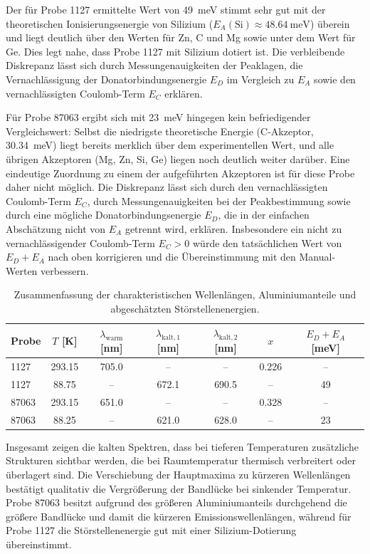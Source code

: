 \documentclass{article}
\begin{document}
Der für Probe 1127 ermittelte Wert von \SI{49}{\milli\electronvolt} stimmt sehr gut mit der theoretischen Ionisierungsenergie von Silizium
($E_A(\mathrm{Si})\approx\SI{48.64}{\milli\electronvolt}$) überein und liegt deutlich über den Werten
für Zn, C und Mg sowie unter dem Wert für Ge. Dies legt nahe, dass Probe 1127 mit Silizium dotiert ist.
Die verbleibende Diskrepanz lässt sich durch Messungenauigkeiten der Peaklagen, die Vernachlässigung
der Donatorbindungsenergie $E_D$ im Vergleich zu $E_A$ sowie den vernachlässigten Coulomb-Term $E_C$
erklären.

Für Probe 87063 ergibt sich mit \SI{23}{\milli\electronvolt} hingegen kein befriedigender Vergleichswert: Selbst die niedrigste theoretische Energie
(C-Akzeptor, \SI{30.34}{\milli\electronvolt}) liegt bereits merklich über dem experimentellen Wert, und
alle übrigen Akzeptoren (Mg, Zn, Si, Ge) liegen noch deutlich weiter darüber. Eine eindeutige
Zuordnung zu einem der aufgeführten Akzeptoren ist für diese Probe daher nicht möglich. Die
Diskrepanz lässt sich durch den vernachlässigten Coulomb-Term $E_C$, durch Messungenauigkeiten bei der
Peakbestimmung sowie durch eine mögliche Donatorbindungsenergie $E_D$, die in der einfachen Abschätzung
nicht von $E_A$ getrennt wird, erklären. Insbesondere ein nicht zu vernachlässigender Coulomb-Term
$E_C>0$ würde den tatsächlichen Wert von $E_D+E_A$ nach oben korrigieren und die Übereinstimmung mit
den Manual-Werten verbessern.

\begin{table}[H]
\centering
\caption{Zusammenfassung der charakteristischen Wellenlängen, Aluminiumanteile und abgeschätzten
Störstellenenergien.}
\label{tab:probe_summary}
\begin{tabular}{lcccccc}
\toprule
Probe &
$T$ [K] &
$\lambda_{\mathrm{warm}}$ [nm] &
$\lambda_{\mathrm{kalt},1}$ [nm] &
$\lambda_{\mathrm{kalt},2}$ [nm] &
$x$ &
$E_D+E_A$ [meV]\\
\midrule
1127 & 293.15 & 705.0 & -- & -- & 0.226 & -- \\
1127 & 88.75 & -- & 672.1 & 690.5 & -- & 49 \\
\midrule
87063 & 293.15 & 651.0 & -- & -- & 0.328 & -- \\
87063 & 88.25 & -- & 621.0 & 628.0 & -- & 23 \\
\bottomrule
\end{tabular}
\end{table}

Insgesamt zeigen die kalten Spektren, dass bei tieferen Temperaturen zusätzliche Strukturen sichtbar
werden, die bei Raumtemperatur thermisch verbreitert oder überlagert sind. Die Verschiebung der
Hauptmaxima zu kürzeren Wellenlängen bestätigt qualitativ die Vergrößerung der Bandlücke bei sinkender
Temperatur. Probe 87063 besitzt aufgrund des größeren Aluminiumanteils durchgehend die größere
Bandlücke und damit die kürzeren Emissionswellenlängen, während für Probe 1127 die Störstellenenergie
gut mit einer Silizium-Dotierung übereinstimmt.
\end{document}
